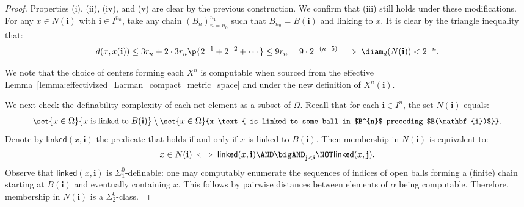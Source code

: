 \begin{proof}
    Properties (i), (ii), (iv), and (v) are clear by the previous construction. We confirm that (iii) still holds under these modifications. For any $x \in N(\mathbf{i})$ with $\mathbf{i} \in I^{n_0}$, take any chain $(B_n)_{n = n_0}^{n_1}$ such that $B_{n_0} = B(\mathbf{i})$ and linking to $x$. It is clear by the triangle inequality that:
    \begin{align*}
        d(x, x(\mathbf{i})) \leq 3r_n + 2 \cdot 3 r_n \p{2^{-1} + 2^{-2} + \cdots} \leq 9 r_n = 9 \cdot 2^{-(n + 5)} \implies \diam_d(N(\mathbf{i})) < 2^{-n}.
    \end{align*}

    We note that the choice of centers forming each $X^n$ is computable when sourced from the effective Lemma~\ref{lemma:effectivized_Larman_compact_metric_space} and under the new definition of $X^{n}(\mathbf{i})$. 

    We next check the definability complexity of each net element as a subset of $\Omega$. Recall that for each $\mathbf{i} \in I^n$, the set $N(\mathbf{i})$ equals:
    \begin{align*}
        \small
        \set{x \in \Omega}{x \text{ is linked to } B(\mathbf{i})} \setminus \set{x \in \Omega}{x \text{ is linked to some ball in $B^{n}$ preceding $B(\mathbf{i})$}}.
    \end{align*}
    Denote by $\mathsf{linked}(x, \mathbf{i})$ the predicate that holds if and only if $x$ is linked to $B(\mathbf{i})$. Then membership in $N(\mathbf{i})$ is equivalent to: 
    \begin{align*}
        x \in N(\mathbf{i}) \iff \mathsf{linked}(x, \mathbf{i}) \AND \bigAND_{\mathbf{j} < \mathbf{i}} \NOT \mathsf{linked}(x, \mathbf{j}).
    \end{align*}
    Observe that $\mathsf{linked}(x, \mathbf{i})$ is $\Sigma^0_1$-definable: one may computably enumerate the sequences of indices of open balls forming a (finite) chain starting at $B(\mathbf{i})$ and eventually containing $x$. This follows by pairwise distances between elements of $\alpha$ being computable. Therefore, membership in $N(\mathbf{i})$ is a $\Sigma^0_2$-class.
    

\end{proof}
